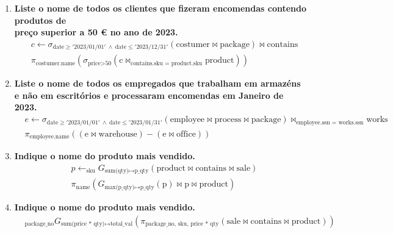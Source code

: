 \documentclass[12pt,a4paper]{article}
\newcommand{\op}{\text}
\begin{document}
\begin{enumerate}

    \item \textbf{Liste o nome de todos os clientes que fizeram encomendas contendo produtos de\\
              preço superior a 50 € no ano de 2023.}
          \[
              \begin{aligned}
                    & c \leftarrow \sigma_{\op{date}\geq'\text{2023/01/01}'~\land~\op{date} \leq '\text{2023/12/31}'}(\op{costumer} \bowtie \op{package})\bowtie \op{contains} \\
                    & \pi _{\op{costumer.name}}( \sigma _{\op{price} > \op{50}} (\op{c} \bowtie _{\op{contains.sku = product.sku}}\op{product}))
              \end{aligned}
          \]

    \item \textbf{Liste o nome de todos os empregados que trabalham em armazéns e não em escritórios e processaram encomendas em Janeiro de 2023.}
          \[
              \begin{aligned}
                   & e \leftarrow \sigma_{\op{date}\geq'\text{2023/01/01}'~\land~\op{date} \leq '\text{2023/01/31}'}(\op{employee} \bowtie \op{process} \bowtie \op{package}) \bowtie _{\op{employee.ssn = works.ssn}} \op{works} \\
                   & \pi _{\op{employee.name}}((\op{e} \bowtie \op{warehouse}) - (\op{e} \bowtie \op{office}))
              \end{aligned}
          \]

    \item \textbf{Indique o nome do produto mais vendido.}
          \[
              \begin{aligned}
                   & p \leftarrow _{\op{sku}}G_{\op{sum(qty)}\mapsto \op{p\_qty}}(\op{product} \bowtie \op{contains} \bowtie \op{sale}) \\
                   & \pi _{\op{name}}(G_{\op{max(p\_qty)}\mapsto\op{p\_qty}}(\op{p}) \bowtie \op{p} \bowtie \op{product})
              \end{aligned}
          \]

    \item \textbf{Indique o nome do produto mais vendido.}
          \[
              \begin{aligned}
                   & _{\op{package\_no}} G _{\op{sum(price * qty)}\mapsto \op{total\_val}}(\pi_{\op{package\_no, sku, price * qty}}(\op{sale} \bowtie \op{contains} \bowtie \op{product}))
              \end{aligned}
          \]

\end{enumerate}
\end{document}

